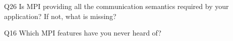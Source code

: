 \begin{description}%
\item{Q26} Is MPI providing all the communication semantics required by your application? If not, what is missing?%
\item{Q16} Which MPI features have you never heard of?%
\end{description}%
